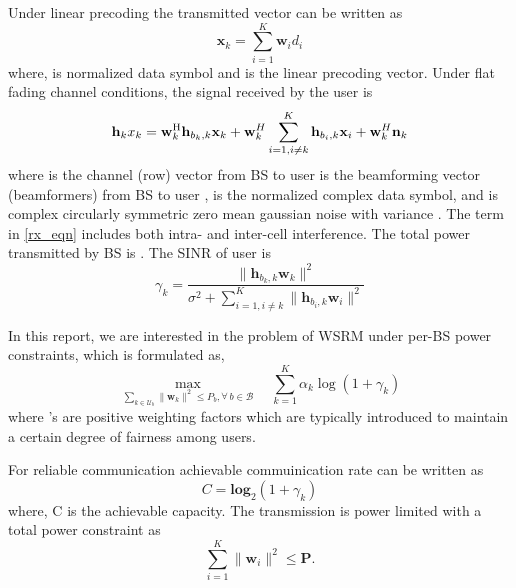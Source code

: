 Under linear precoding the transmitted vector  can be written as
\begin{equation}
\mathbf{x}_k = \sum^K_{i=1} \mathbf{w}_i d_i
\label{precoder2_eqn}
\end{equation}
where,  is normalized data symbol and  is the linear precoding vector. Under flat fading channel conditions, the signal received by the  user is
\begin{equation}
\mathbf{h}_k x_k = \mathbf{w}^{\mathrm{H}}_{k} \mathbf{h}_{{b_k},k} \mathbf{x}_k  + \mathbf{w}^H_k \sum_{i = 1, i \neq k}^{K} \mathbf{h}_{{b_i},k} \mathbf{x}_i + \mathbf{w}^H_k \mathbf{n}_k
\label{cent1_eqn}
\end{equation}
where  is the channel (row) vector from BS  to user  is the beamforming vector (beamformers) from BS  to user ,  is the normalized complex data symbol, and  is complex circularly symmetric zero mean gaussian noise with variance . The term  in \eqref{rx_eqn} includes both intra- and inter-cell interference. The total power transmitted by \acs{BS}  is . The \acs{SINR}  of user  is
\begin{equation}
\gamma_k = \frac{ \|\mathbf{h}_{b_k,k} \mathbf{w}_k\|^{2}}{\sigma^{2}+\sum_{i = 1, i \neq k}^{K} \|\mathbf{h}_{b_i,k} \mathbf{w}_{i}\|^{2}}
\label{precoder3_eqn}
\end{equation}

In this report, we are interested in the problem of \acs{WSRM} under per-BS power constraints, which is formulated as,
\begin{equation}
\max_{\sum_{k \in \mathcal{U}_b} \| \mathbf{w}_k \|^2 \leq {P_b}, \forall \, b \in \mathcal{B} }  \quad \sum_{k = 1}^{K} \alpha_k \log(1 + \gamma_k)
\label{constraint_eqn}
\end{equation}
where 's are positive weighting factors which are typically introduced to maintain a certain degree of fairness among users.

For reliable communication achievable commuinication rate can be written as
\begin{equation}
C = \mathbf{log}_2(1 + \gamma_k) 
\label{precoder4_eqn}
\end{equation}
where, C is the achievable capacity. The transmission is power limited with a total power constraint as
\begin{equation}
\sum_{i = 1}^{K} \|\mathbf{w}_i\|^2 \leq \mathbf{P}.
\label{precoder5_eqn}
\end{equation} 

